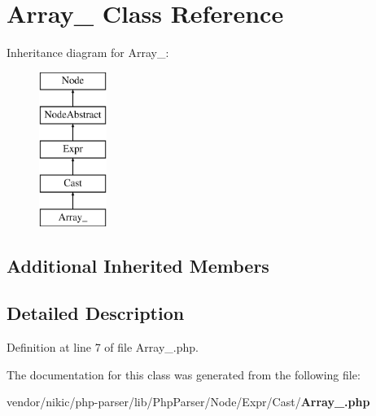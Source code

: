 \section{Array\+\_\+ Class Reference}
\label{class_php_parser_1_1_node_1_1_expr_1_1_cast_1_1_array__}
Inheritance diagram for Array\+\_\+\+:\begin{figure}[H]
\begin{center}
\leavevmode
\includegraphics[height=5.000000cm]{class_php_parser_1_1_node_1_1_expr_1_1_cast_1_1_array__}
\end{center}
\end{figure}
\subsection*{Additional Inherited Members}


\subsection{Detailed Description}


Definition at line 7 of file Array\+\_\+.\+php.



The documentation for this class was generated from the following file\+:\begin{DoxyCompactItemize}
\item 
vendor/nikic/php-\/parser/lib/\+Php\+Parser/\+Node/\+Expr/\+Cast/{\bf Array\+\_\+.\+php}\end{DoxyCompactItemize}
